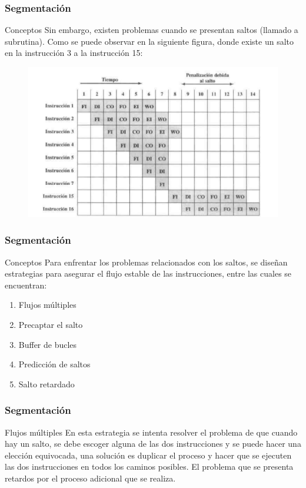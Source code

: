 \documentclass{beamer}
\begin{document}
\begin{frame}
	\frametitle{Segmentación}
	\begin{block}{Conceptos}
	Sin embargo, existen problemas cuando se presentan saltos (llamado a subrutina). Como se puede observar en la siguiente figura, donde existe un salto en la instrucción 3 a la instrucción 15:
	\end{block}	
	\begin{figure}[H]
		\centering
		\includegraphics[scale=0.3]{imagenes/segmentacionsalto.png} 
	\end{figure}		 		
\end{frame}

\begin{frame}
	\frametitle{Segmentación}
	\begin{block}{Conceptos}
	Para enfrentar los problemas relacionados con los saltos, se diseñan estrategias para asegurar el flujo estable de las instrucciones, entre las cuales se encuentran:
	\begin{enumerate}
		\item Flujos múltiples
		\item Precaptar el salto
		\item Buffer de bucles
		\item Predicción de saltos
		\item Salto retardado
	\end{enumerate}
	\end{block}		 		
\end{frame}

\begin{frame}
	\frametitle{Segmentación}
	\begin{block}{Flujos múltiples}
	En esta estrategia se intenta resolver el problema de que cuando hay un salto, se debe escoger alguna de las dos instrucciones y se puede hacer una elección equivocada, una solución es duplicar el proceso y hacer que se ejecuten las dos instrucciones en todos los caminos posibles. El problema que se presenta retardos por el proceso adicional que se realiza.
	\end{block}		 		
\end{frame}
\end{document}
